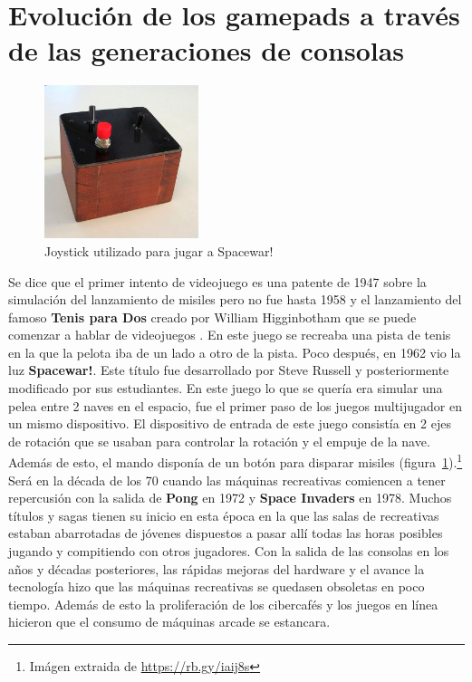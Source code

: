 \section{Evoluci\'on de los gamepads a trav\'es de las generaciones de consolas}

\begin{figure}[t]
\centering
\includegraphics[width=0.4\textwidth]{./Imagenes/Bitmap/spacewar-controller.jpg}
\caption{Joystick utilizado para jugar a Spacewar!}
\label{Fig:spacewar}
\end{figure}
Se dice que el primer intento de videojuego es una patente de 1947 sobre la simulaci\'on del lanzamiento de misiles pero no fue hasta 1958 y el lanzamiento del famoso \textbf{Tenis para Dos} creado por William Higginbotham que se puede comenzar a hablar de videojuegos \citep{tenispara2}. En este juego se recreaba una pista de tenis en la que la pelota iba de un lado a otro de la pista. Poco despu\'es, en 1962 vio la luz \textbf{Spacewar!}. Este t\'itulo fue desarrollado por Steve Russell y posteriormente modificado por sus estudiantes. En este juego lo que se quer\'ia era simular una pelea entre 2 naves en el espacio, fue el primer paso de los juegos multijugador en un mismo dispositivo. El dispositivo de entrada de este juego consist\'ia en 2 ejes de rotaci\'on que se usaban para controlar la rotaci\'on y el empuje de la nave. Adem\'as de esto, el mando dispon\'ia de un bot\'on para disparar misiles (figura~\ref{Fig:spacewar}).\footnote{Im\'agen extraida de \url{https://rb.gy/iaij8s}}\\




Ser\'a en la d\'ecada de los 70 cuando las m\'aquinas recreativas comiencen a tener repercusi\'on con la salida de \textbf{Pong} en 1972 y \textbf{Space Invaders} en 1978. Muchos t\'itulos y sagas tienen su inicio en esta \'epoca en la que las salas de recreativas estaban abarrotadas de j\'ovenes dispuestos a pasar all\'i todas las horas posibles jugando y compitiendo con otros jugadores. Con la salida de las consolas en los a\~nos y d\'ecadas posteriores, las r\'apidas mejoras del hardware y el avance la tecnolog\'ia hizo que las m\'aquinas recreativas se quedasen obsoletas en poco tiempo. Adem\'as de esto la proliferaci\'on de los cibercaf\'es y los juegos en l\'inea hicieron que el consumo de m\'aquinas arcade se estancara. \\

